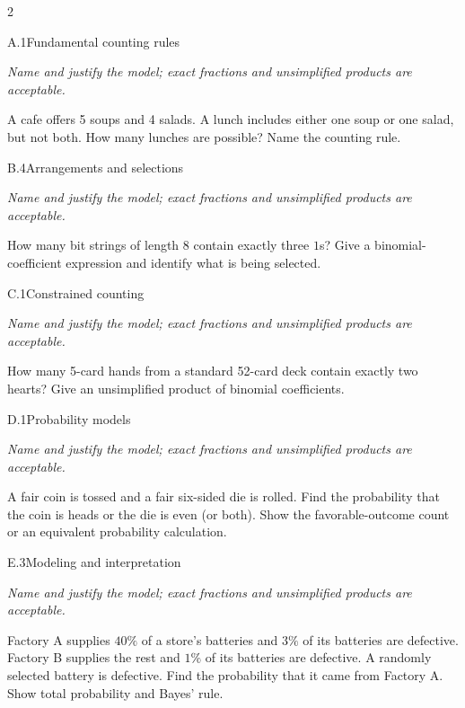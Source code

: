 \documentclass[9pt]{extarticle}
\begin{document}
\CoreWorkArea
\FormBreak
{}
\begin{multicols}{2}
\begin{CoreProblem}{A.1}{Fundamental counting rules}
{\scriptsize\textit{Name and justify the model; exact fractions and unsimplified products are acceptable.}\par}
A cafe offers 5 soups and 4 salads. A lunch includes either one soup
    or one salad, but not both. How many lunches are possible? Name the counting
    rule.
\end{CoreProblem}
\begin{CoreProblem}{B.4}{Arrangements and selections}
{\scriptsize\textit{Name and justify the model; exact fractions and unsimplified products are acceptable.}\par}
How many bit strings of length 8 contain exactly three $1$s? Give a
    binomial-coefficient expression and identify what is being selected.
\end{CoreProblem}
\begin{CoreProblem}{C.1}{Constrained counting}
{\scriptsize\textit{Name and justify the model; exact fractions and unsimplified products are acceptable.}\par}
How many 5-card hands from a standard 52-card deck contain exactly
    two hearts? Give an unsimplified product of binomial coefficients.
\end{CoreProblem}
\columnbreak
\begin{CoreProblem}{D.1}{Probability models}
{\scriptsize\textit{Name and justify the model; exact fractions and unsimplified products are acceptable.}\par}
A fair coin is tossed and a fair six-sided die is rolled. Find the
    probability that the coin is heads or the die is even (or both). Show the
    favorable-outcome count or an equivalent probability calculation.
\end{CoreProblem}
\begin{CoreProblem}{E.3}{Modeling and interpretation}
{\scriptsize\textit{Name and justify the model; exact fractions and unsimplified products are acceptable.}\par}
Factory A supplies $40\%$ of a store's batteries and $3\%$ of its
    batteries are defective. Factory B supplies the rest and $1\%$ of its
    batteries are defective. A randomly selected battery is defective. Find the
    probability that it came from Factory A. Show total probability and Bayes'
    rule.
\end{CoreProblem}
\end{multicols}
\end{document}

